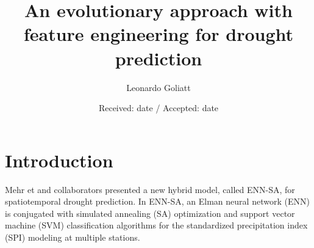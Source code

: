 \documentclass[smallextended]{svjour3}       %
\begin{document}
\title{
An evolutionary approach with feature engineering  for drought prediction
}


\author{
        Leonardo Goliatt  {\large *}
        }



\date{Received: date / Accepted: date}


\maketitle              %
%
\begin{abstract}

\end{abstract}
%
%
%
\section{Introduction}\label{sec:intro}


Mehr et and collaborators \cite{danandehmehr2020neuroannealing}
presented a new hybrid model, called ENN-SA, for spatiotemporal drought prediction. In ENN-SA, an Elman neural network (ENN) is conjugated with simulated annealing (SA) optimization and support vector machine (SVM) classification algorithms for the standardized precipitation index (SPI) modeling at multiple stations.
\end{document}
